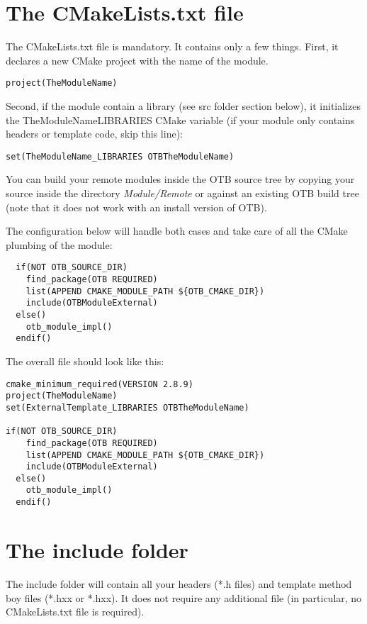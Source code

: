 \section{The CMakeLists.txt file}

The CMakeLists.txt file is mandatory. It contains only a few things.
First, it declares a new CMake project with the name of the module. 

\begin{verbatim}
project(TheModuleName)
\end{verbatim}

Second, if the module contain a library (see src folder section below), it initializes the TheModuleName\textunderscore LIBRARIES CMake variable (if your module only contains headers or template code, skip this line): 

\begin{verbatim}
set(TheModuleName_LIBRARIES OTBTheModuleName)
\end{verbatim}

You can build your remote modules inside the OTB source tree by copying your
source inside the directory \textit{Module/Remote} or against an existing OTB
build tree (note that it does not work with an install version of OTB). 

The configuration below will handle both cases and take care of all the CMake
plumbing of the module:

\begin{verbatim}
  if(NOT OTB_SOURCE_DIR)
    find_package(OTB REQUIRED)
    list(APPEND CMAKE_MODULE_PATH ${OTB_CMAKE_DIR})
    include(OTBModuleExternal)
  else()
    otb_module_impl()
  endif()
\end{verbatim}

The overall file should look like this:
 
\begin{verbatim}
cmake_minimum_required(VERSION 2.8.9)
project(TheModuleName)
set(ExternalTemplate_LIBRARIES OTBTheModuleName)

if(NOT OTB_SOURCE_DIR)
    find_package(OTB REQUIRED)
    list(APPEND CMAKE_MODULE_PATH ${OTB_CMAKE_DIR})
    include(OTBModuleExternal)
  else()
    otb_module_impl()
  endif()
\end{verbatim}

\section{The include folder}

The include folder will contain all your headers (*.h files) and template method boy files (*.hxx or *.hxx). It does not require any additional file (in particular, no CMakeLists.txt file is required). 

